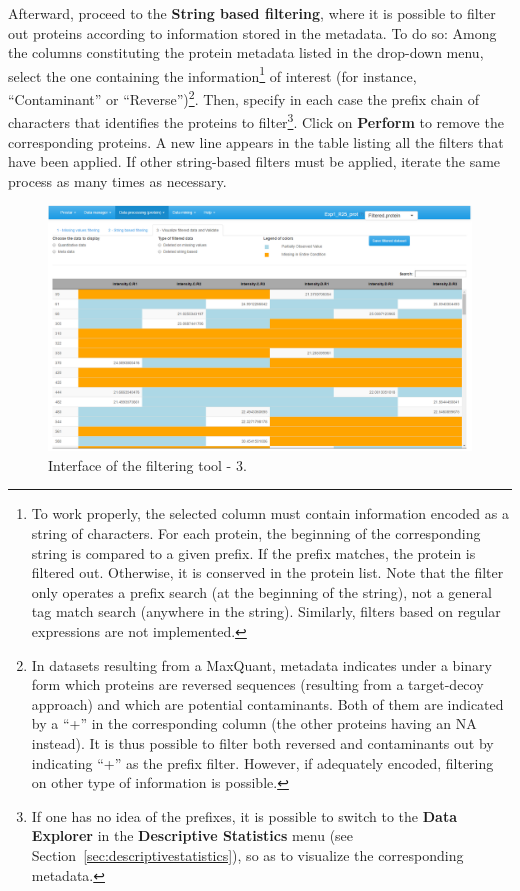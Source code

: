 \documentclass[12pt]{article}
\begin{document}
Afterward, proceed to the \textbf{String based filtering},
where it is possible to filter out proteins according to information stored in the metadata.
To do so: Among the columns constituting the protein metadata listed in the drop-down menu, 
select the one containing the information\footnote{To work properly, the selected column must 
contain information encoded as a string of characters. For each protein, the beginning of 
the corresponding string is compared to a given prefix. If the prefix matches, the protein is filtered out. 
Otherwise, it is conserved in the protein list. Note that the filter only operates a prefix search 
(at the beginning of the string), not a general tag match search (anywhere in the string). 
Similarly, filters based on regular expressions are not implemented.}
of interest (for instance, 
``Contaminant'' or ``Reverse'')\footnote{In datasets resulting from a MaxQuant, 
metadata indicates under a binary form which proteins are reversed sequences 
(resulting from a target-decoy approach) and which are potential contaminants. 
Both of them are indicated by a ``+'' in the corresponding column (the other 
proteins having an NA instead). It is thus possible to filter both reversed and 
contaminants out by indicating ``+'' as the prefix filter. However, if adequately encoded, 
filtering on other type of information is possible.}. Then, specify in each case 
the prefix chain of characters that identifies the proteins to filter\footnote{If one 
has no idea of the prefixes, it is possible to switch to the \textbf{Data Explorer} 
in the \textbf{Descriptive Statistics} menu (see Section~\ref{sec:descriptivestatistics}), 
so as to visualize the corresponding metadata.}.
Click on \textbf{Perform} to remove the corresponding proteins. 
A new line appears in the table listing all the filters that have been applied.
If other string-based filters must be applied, iterate the same process as many times
as necessary.

\begin {figure}
\includegraphics[width=\textwidth]{images/filter3.png}
\caption{Interface of the filtering tool - 3.}\label{fig:filter3}
\end {figure}
\end{document}
